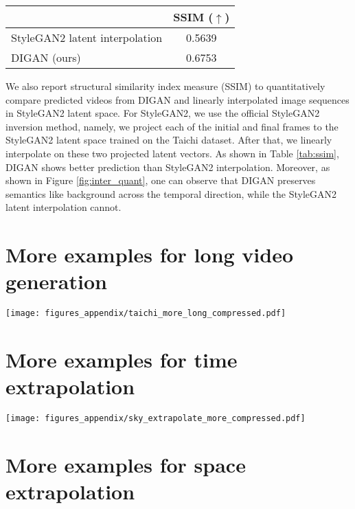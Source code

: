 \documentclass{article} \usepackage{iclr2022_conference,times}
\begin{document}
\begin{table*}[h]
\centering
\caption{
SSIM of intermediate scenes predicted by StyleGAN2 and our method, \sname.
}
\vspace{-0.1in}
\begin{tabular}{lc}
\toprule
& SSIM ($\uparrow$) \\
\midrule
StyleGAN2 latent interpolation & 0.5639 \\
DIGAN (ours)                   & 0.6753 \\
\bottomrule
\end{tabular}
\label{tab:ssim}
\end{table*}

We also report structural similarity index measure (SSIM) to quantitatively compare predicted videos from DIGAN and linearly interpolated image sequences in StyleGAN2 latent space. For StyleGAN2, we use the official StyleGAN2 inversion method, namely, we project each of the initial and final frames to the StyleGAN2 latent space trained on the Taichi dataset. After that, we linearly interpolate on these two projected latent vectors. As shown in Table \ref{tab:ssim}, DIGAN shows better prediction than StyleGAN2 interpolation. Moreover, as shown in Figure \ref{fig:inter_quant}, one can observe that DIGAN preserves semantics like background across the temporal direction, while the StyleGAN2 latent interpolation cannot.
 
\clearpage
\section{More examples for long video generation}
\label{appen:more_long}

\begin{figure*}[h]
\centering
\texttt{[image: figures\_appendix/taichi\_more\_long\_compressed.pdf]}
\caption{
Additional 128 frame videos of 128×128 resolution by \sname, on the TaiChi dataset.
}\label{fig:more_long}
\end{figure*}
 
\clearpage
\section{More examples for time extrapolation}
\label{appen:more_time}

\begin{figure*}[h]
\centering
\texttt{[image: figures\_appendix/sky\_extrapolate\_more\_compressed.pdf]}
\caption{
Additional time extrapolation videos of MoCoGAN-HD and \sname, trained on 16 frame videos of 128$\times$128 resolution on the Sky dataset. Yellow box indicates the extrapolated frames.
}\label{fig:more_time_extra}
\end{figure*} \section{More examples for space extrapolation}
\label{appen:more_space}
\end{document}
